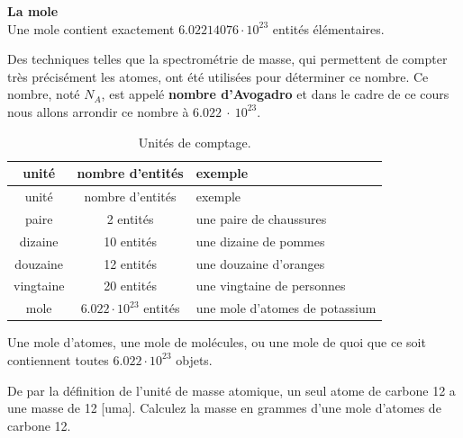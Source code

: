 \documentclass[
  11pt,
  french,
  a4paper,
  openany]{book}
\begin{document}
\begin{tcolorbox}
\textbf{La mole}\\
Une mole contient exactement \(6.02214076\cdot10^{23}\) entités élémentaires.

\end{tcolorbox}

Des techniques telles que la spectrométrie de masse, qui permettent de compter très précisément les atomes, ont été utilisées pour déterminer ce nombre. Ce nombre, noté \(N_A\), est appelé \textbf{nombre d'Avogadro} et dans le cadre de ce cours nous allons arrondir ce nombre à \(6.022\:\cdot\:10^{23}\).

\begin{longtable}[]{@{}ccl@{}}
\caption{\label{tab:unites-de-comptage} Unités de comptage.}\tabularnewline
\toprule
unité & nombre d'entités & exemple\tabularnewline
\midrule
\endfirsthead
\toprule
unité & nombre d'entités & exemple\tabularnewline
\midrule
\endhead
paire & 2 entités & une paire de chaussures\tabularnewline
dizaine & 10 entités & une dizaine de pommes\tabularnewline
douzaine & 12 entités & une douzaine d'oranges\tabularnewline
vingtaine & 20 entités & une vingtaine de personnes\tabularnewline
mole & \(6.022\cdot10^{23}\) entités & une mole d'atomes de potassium\tabularnewline
\bottomrule
\end{longtable}

Une mole d'atomes, une mole de molécules, ou une mole de quoi que ce soit contiennent toutes \(6.022\cdot10^{23}\) objets.

\begin{Exercise}

De par la définition de l'unité de masse atomique, un seul atome de carbone 12 a une masse de 12 {[}uma{]}. Calculez la masse en grammes d'une mole d'atomes de carbone 12.



\end{Exercise}
\end{document}
